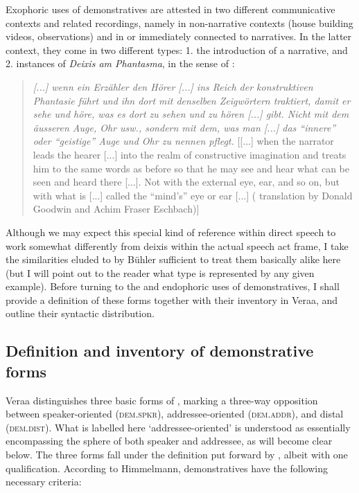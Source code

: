 \documentclass[output=paper
,modfonts
,nonflat]{langsci/langscibook}
\begin{document}
Exophoric uses of demonstratives are attested in two different communicative contexts and related recordings, namely in non-narrative contexts (house building videos, observations) and in or immediately connected to narratives. In the latter context, they come in two different types: 1. the introduction of a narrative, and 2. instances of \textit{Deixis am Phantasma}, in the sense of \citealp[131]{Buehler1934}:

\begin{quote}
\textit{[...] wenn ein Erz\"ahler den H\"orer [...] ins Reich der konstruktiven Phantasie f\"uhrt und ihn dort mit denselben Zeigw\"ortern traktiert, damit er sehe und h\"ore, was es dort zu sehen und zu h\"oren [...] gibt. Nicht mit dem \"ausseren Auge, Ohr usw., sondern mit dem, was man [...] das "`innere"' oder "`geistige"' Auge und Ohr zu nennen pflegt.} 
[[...] when the narrator leads the hearer [...] into the realm of constructive imagination and treats him to the same  words as before so that he may see and hear what can be seen and heard there [...]. Not with the external eye, ear, and so on, but with what is [...] called the ``mind's'' eye or ear [...] ( translation by Donald Goodwin and Achim Fraser Eschbach)]
\end{quote}

\noindent
Although we may expect this special kind of  reference within direct speech to work somewhat differently from deixis within the actual speech act frame, I take the similarities eluded to by B\"uhler sufficient to treat them basically alike here (but I will point out to the reader what type is represented by any given example). Before turning to the  and endophoric uses of demonstratives, I shall provide a definition of these forms together with their inventory in Vera{\textquotesingle}a, and outline their syntactic distribution.



\subsection{Definition and inventory of demonstrative forms} \label{demvradefinv}
Vera{\textquotesingle}a distinguishes three basic forms of , marking a three-way opposition between speaker-oriented (\textsc{dem.spkr}), addressee-oriented (\textsc{dem.addr}), and distal (\textsc{dem.dist}). What is labelled here `addressee-oriented' is understood as essentially encompassing the sphere of both speaker and addressee, as will become clear below. The three forms fall under the definition put forward by \cite[210]{Himmelmann1996}, albeit with one qualification. According to Himmelmann, demonstratives have the following necessary criteria:
\end{document}
